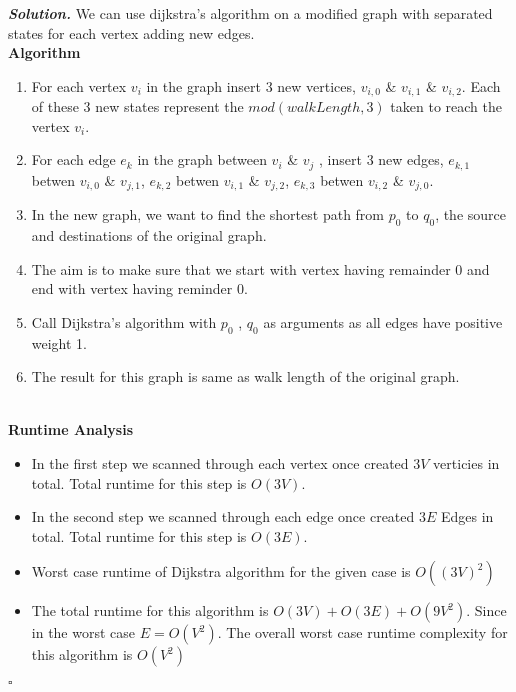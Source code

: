 \documentclass[12pt]{article}
\newenvironment{solution}[1][\it{Solution}]{\textbf{#1. } }{$\square$}
\begin{document}
\begin{solution}
	We can use dijkstra's algorithm on a modified graph with separated states for each vertex adding new edges. 
 \\ \textbf{Algorithm}\\
 \begin{enumerate}
     \item For each vertex $v_i$ in the graph insert 3 new vertices, $v_{i,0}$ \& $v_{i,1}$ \& $v_{i,2}$. Each of these 3 new states represent the $mod(walkLength,3)$ taken to reach the vertex $v_i$. 
     \item For each edge $e_k$ in the graph between $v_i$ \& $v_j$ , insert 3 new edges,  $e_{k,1}$ betwen $v_{i,0}$ \&  $v_{j,1}$, $e_{k,2}$ betwen $v_{i,1}$ \&  $v_{j,2}$, $e_{k,3}$ betwen $v_{i,2}$ \&  $v_{j,0}$.
     \item In the new graph, we want to find the shortest path from $p_{0}$ to $q_{0}$, the source and destinations of the original graph. 
     \item The aim is to make sure that we start with vertex having remainder $0$ and end with vertex having reminder $0$. 
     \item Call Dijkstra's algorithm with $p_{0}$ , $q_{0}$ as arguments as all edges have positive weight 1. 
     \item The result for this graph is same as walk length of the original graph.
 \end{enumerate}
 \\ \textbf{Runtime Analysis} \\
 \begin{itemize}
     \item In the first step we scanned through each vertex once created $3V$ verticies in total. Total runtime for this step is $O(3V)$. 
     \item In the second step we scanned through each edge once created $3E$ Edges in total. Total runtime for this step is $O(3E)$.
     \item Worst case runtime of Dijkstra algorithm for the given case is $O((3V)^2)$
     \item The total runtime for this algorithm is $O(3V)+O(3E)+O(9V^2)$. Since in the worst case $E = O(V^2)$. The overall worst case runtime complexity for this algorithm is $O(V^2)$
 \end{itemize}
\end{solution} 

\hrulefill %
\end{document}
